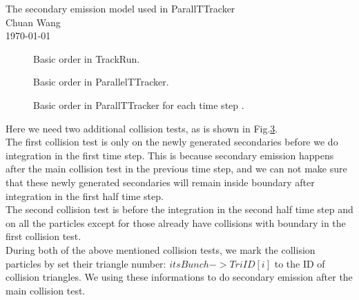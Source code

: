 \documentclass[a4paper,11pt]{article}
\begin{document}
\begin{center}
{\large The secondary emission model used in ParallTTracker} \\
Chuan Wang \\
\today\\
\end{center}
\begin{figure}[H]
\begin{center}

\end{center}
\caption{  Basic order in TrackRun.\label{fig:T-R}}
\end{figure}

\begin{figure}[H]
\begin{center}

\end{center}
\caption{  Basic order in ParallelTTracker.\label{fig:T-T}}
\end{figure}

\begin{figure}[H]
\begin{center}

\end{center}
\caption{  Basic order in ParallTTracker for each time step .\label{fig:se}}
\end{figure}
Here we need two additional collision tests, as is shown in Fig.\ref{fig:se}.\\

The first collision test is only on the newly generated secondaries before we do integration in the first time step. This is because secondary emission happens after the main collision test in the previous time step, and we can not make sure that these newly generated secondaries will remain inside boundary after integration in the first half time step.\\

The second collision test is before the integration in the second half time step and on all the particles except for those already have collisions with boundary in the first collision test.\\

During both of the above mentioned collision tests, we mark the collision particles by set their triangle number: $itsBunch->TriID[i]$ to the ID of collision triangles. We using these informations to do secondary emission after the main collision test.     
\end{document}
